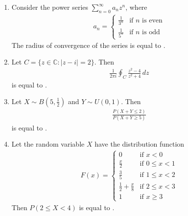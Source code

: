 \documentclass[journal]{IEEEtran}
\numberwithin{equation}{enumi}
\numberwithin{figure}{enumi}
\begin{document}
\begin{enumerate}
\item Consider the power series \( \sum_{n=0}^{\infty} a_n z^n \), where
\hfill{}
\begin{align*}
a_n = \begin{cases}
    \frac{1}{3^n} & \text{if $n$ is even} \\
    \frac{1}{5^n} & \text{if $n$ is odd}
\end{cases}
\end{align*}
The radius of convergence of the series is equal to \underline{\hspace{2cm}}.
\vspace{1em}


\item Let \( C = \{ z \in \mathbb{C} : |z - i| = 2 \} \). Then
\hfill{}
\begin{align*}
\frac{1}{2\pi i} \oint_C \frac{z^2 - 4}{z^2 + 4}\,dz
\end{align*}
is equal to  \underline{\hspace{2cm}}.
\vspace{1em}

\item Let \( X \sim B\left(5, \frac{1}{2}\right) \) and \( Y \sim U(0,1) \).
Then 
\hfill{}
\begin{align*}
\frac{P(X + Y \leq 2)}{P(X + Y \geq 5)}
\end{align*}
is equal to \underline{\hspace{2cm}}.
\vspace{1em}

\item Let the random variable \( X \) have the distribution function
\hfill{}
\begin{align*}
F(x) = 
\begin{cases}
0 & \text{if } x < 0 \\[8pt]
\frac{x}{2} & \text{if } 0 \leq x < 1 \\[8pt]
\frac{3}{5} & \text{if } 1 \leq x < 2 \\[8pt]
\frac{1}{2} + \frac{x}{8} & \text{if } 2 \leq x < 3 \\[8pt]
1 & \text{if } x \geq 3
\end{cases}
\end{align*}
Then \( P(2 \leq X < 4) \) is equal to \underline{\hspace{2cm}}.


\end{enumerate}
\end{document}
